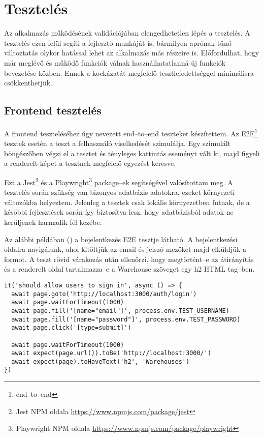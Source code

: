 \chapter{Tesztelés}

Az alkalmazás működésének validációjában elengedhetetlen lépés a tesztelés.
A tesztelés ezen felül segíti a fejlesztő munkáját is, bármilyen aprónak tűnő változtatás olykor hatással lehet az alkalmazás más részeire is.
Előfordulhat, hogy már meglévő és működő funkciók válnak használhatatlanná új funkciók bevezetése közben.
Ennek a kockázatát megfelelő tesztlefedettséggel minimálisra csökkenthetjük.

\section{Frontend tesztelés}

A frontend teszteléséhez úgy nevezett end–to–end teszteket készítettem.
Az E2E\footnote{end–to–end} tesztek esetén a teszt a felhasználó viselkedését szimulálja.
Egy szimulált böngészőben végzi el a tesztet és tényleges kattintás eseményt vált ki, majd figyeli a renderelt képet a tesztnek megfelelő egyezést keresve.

Ezt a Jest\footnote{Jest NPM oldala \url{https://www.npmjs.com/package/jest}} és a Playwright\footnote{Playwright NPM oldala \url{https://www.npmjs.com/package/playwright}} package–ek segítségével valósítottam meg.
A tesztelés során szükség van bizonyos adatbázis adatokra, ezeket környezeti változókba helyeztem.
Jelenleg a tesztek csak lokális környezetben futnak, de a későbbi fejlesztések során így biztosítva lesz, hogy adatbázisból adatok ne kerüljenek harmadik fél kezébe.

Az alábbi példában () a bejelentkezés E2E tesztje látható. A bejelentkezési oldalra navigálunk, ahol kitöltjük az email és jelszó mezőket majd elküldjük a formot. A teszt rövid várakozás után ellenőrzi, hogy megtörtént–e az átirányítás és a renderelt oldal tartalmazza–e a Warehouse szöveget egy h2 HTML tag–ben.

\begin{lstlisting}[style=ES6, caption={Bejelentkezés E2E teszt},label={lst:e2e}]
it('should allow users to sign in', async () => {
  await page.goto('http://localhost:3000/auth/login')
  await page.waitForTimeout(1000)
  await page.fill('[name="email"]', process.env.TEST_USERNAME)
  await page.fill('[name="password"]', process.env.TEST_PASSWORD)
  await page.click('[type=submit]')

  await page.waitForTimeout(1000)
  await expect(page.url()).toBe('http://localhost:3000/')
  await expect(page).toHaveText('h2', 'Warehouses')
})
\end{lstlisting}

